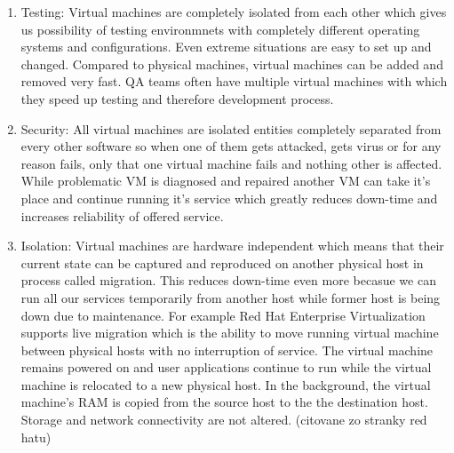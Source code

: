 \begin{enumerate}
\item Testing: Virtual machines are completely isolated from each other which gives us possibility of testing environmnets with completely different operating systems and configurations. Even extreme situations are easy to set up and changed. Compared to physical machines, virtual machines can be added and removed very fast. QA teams often have multiple virtual machines with which they speed up testing and therefore development process.

\item Security: All virtual machines are isolated entities completely separated from every other software so when one of them gets attacked, gets virus or for any reason fails, only that one virtual machine fails and nothing other is affected. While problematic VM is diagnosed and repaired another VM can take it's place and continue running it's service which greatly reduces down-time and increases reliability of offered service.

\item Isolation: Virtual machines are hardware independent which means that their current state can be captured and reproduced on another physical host in process called migration. This reduces down-time even more becasue we can run all our services temporarily from another host while former host is being down due to maintenance. For example Red Hat Enterprise Virtualization supports live migration which is the ability to move running virtual machine between physical hosts with no interruption of service. The virtual machine remains powered on and user applications continue to run while the virtual machine is relocated to a new physical host. In the background, the virtual machine's RAM is copied from the source host to the the destination host. Storage and network connectivity are not altered. (citovane zo stranky red hatu)
\end{enumerate}

